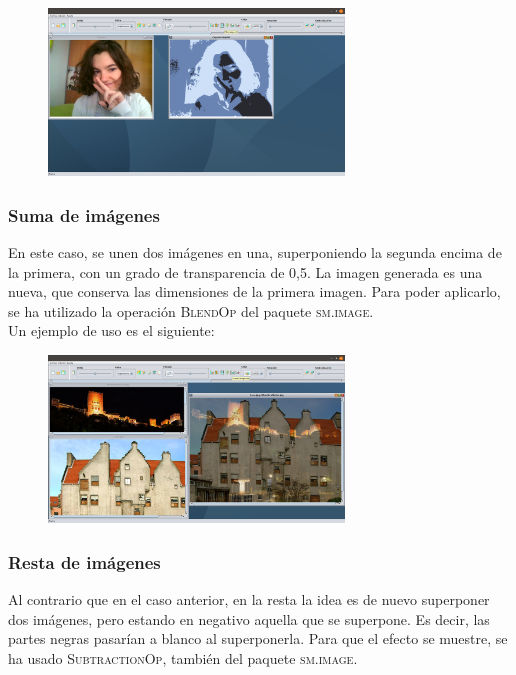 \documentclass[11pt,a4paper]{article}
\begin{document}
\begin{figure}[H]
\centering
	\includegraphics[width=0.7\textwidth]{img/xray.png}
\end{figure}

\subsubsection{Suma de imágenes}
En este caso, se unen dos imágenes en una, superponiendo la segunda encima de la primera, con un grado de transparencia de 0,5. La imagen generada es una nueva, que conserva las dimensiones de la primera imagen. Para poder aplicarlo, se ha utilizado la operación \textsc{BlendOp} del paquete \textsc{sm.image}.\\

Un ejemplo de uso es el siguiente:

\begin{figure}[H]
\centering
	\includegraphics[width=0.7\textwidth]{img/suma.png}
\end{figure}

\subsubsection{Resta de imágenes}
Al contrario que en el caso anterior, en la resta la idea es de nuevo superponer dos imágenes, pero estando en negativo aquella que se superpone. Es decir, las partes negras pasarían a blanco al superponerla. Para que el efecto se muestre, se ha usado \textsc{SubtractionOp}, también del paquete \textsc{sm.image}.\\
\end{document}
